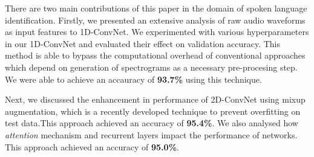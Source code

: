\documentclass[runningheads]{llncs}
\begin{document}
There are two main contributions of this paper in the domain of spoken language identification. Firstly, we presented an extensive analysis of raw audio waveforms as input features to 1D-ConvNet. We experimented with various hyperparameters in our 1D-ConvNet and evaluated their effect on validation accuracy. This method is able to bypass the computational overhead of conventional approaches which depend on generation of spectrograms as a necessary pre-procesing step. We were able to achieve an accauracy of \textbf{93.7\%} using this technique.

Next, we discussed the enhancement in performance of 2D-ConvNet using mixup augmentation, which is a recently developed technique to prevent overﬁtting on test data.This approach achieved an accuracy of \textbf{95.4\%}. We also analysed how \emph{attention} mechanism and recurrent layers impact the performance of networks. This approach achieved an accuracy of \textbf{95.0\%}.



\end{document}
